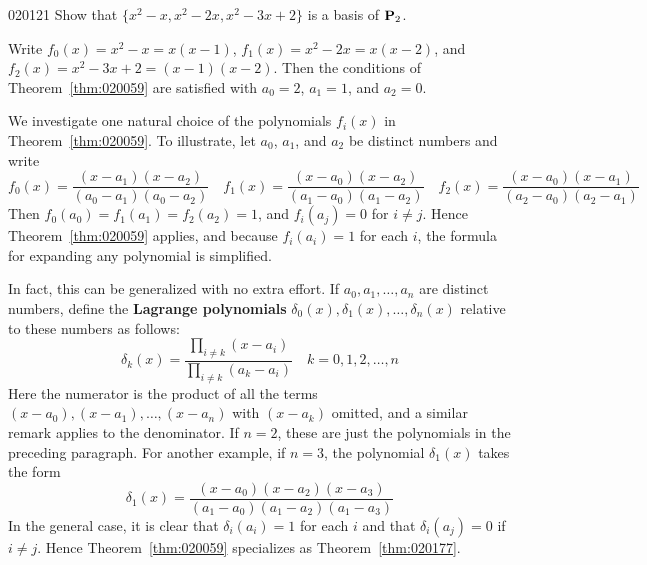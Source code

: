 \begin{example}{}{020121}
Show that $\{x^{2} - x, x^{2} - 2x, x^{2} - 3x + 2\}$ is a basis of $\textbf{P}_{2}$.

\begin{solution}
Write $f_{0}(x) = x^{2} - x = x(x - 1)$, $f_{1}(x) = x^{2} - 2x = x(x - 2)$, and $f_{2}(x) = x^{2} - 3x + 2 = (x - 1)(x - 2)$. Then the conditions of Theorem~\ref{thm:020059} are satisfied with $a_{0} = 2$, $a_{1} = 1$, and $a_{2} = 0$.
\end{solution}
\end{example}

We investigate one natural choice of the polynomials $f_{i}(x)$ in Theorem~\ref{thm:020059}. To illustrate, let $a_{0}$, $a_{1}$, and $a_{2}$ be distinct numbers and write
\begin{equation*}
f_0(x) = \frac{(x - a_1)(x - a_2)}{(a_0 - a_1)(a_0 - a_2)}\quad 
f_1(x) = \frac{(x - a_0)(x - a_2)}{(a_1 - a_0)(a_1 - a_2)}\quad 
f_2(x) = \frac{(x - a_0)(x - a_1)}{(a_2 - a_0)(a_2 - a_1)} 
\end{equation*}
Then $f_{0}(a_{0}) = f_{1}(a_{1}) = f_{2}(a_{2}) = 1$, and $f_{i}(a_{j}) = 0$ for $i \neq j$. Hence Theorem~\ref{thm:020059} applies, and because $f_{i}(a_{i}) = 1$ for each $i$, the formula for expanding any polynomial is simplified.

In fact, this can be generalized with no extra effort. If $a_{0}, a_{1}, \dots, a_{n}$ are distinct numbers, define the \textbf{Lagrange polynomials} $\delta_{0}(x), \delta_{1}(x), \dots, \delta_{n}(x)$ relative to these numbers as follows:
\begin{equation*}
\delta_k(x) = \frac{\prod_{i \neq k}(x - a_i)}{\prod_{i \neq k}(a_k - a_i)}\quad
k = 0, 1, 2, \dots, n
\end{equation*}
Here the numerator is the product of all the terms $(x - a_{0}), (x - a_{1}), \dots, (x - a_{n})$ with $(x - a_{k})$ omitted, and a similar remark applies to the denominator. If $n = 2$, these are just the polynomials in the preceding paragraph. For another example, if $n = 3$, the polynomial $\delta_{1}(x)$ takes the form
\begin{equation*}
\delta_1(x) = \frac{(x - a_0)(x - a_2)(x - a_3)}{(a_1 - a_0)(a_1 - a_2)(a_1 - a_3)}
\end{equation*}
In the general case, it is clear that $\delta_{i}(a_{i}) = 1$ for each $i$ and that $\delta_{i}(a_{j}) = 0$ if $i \neq j$. Hence Theorem~\ref{thm:020059} specializes as Theorem~\ref{thm:020177}.

